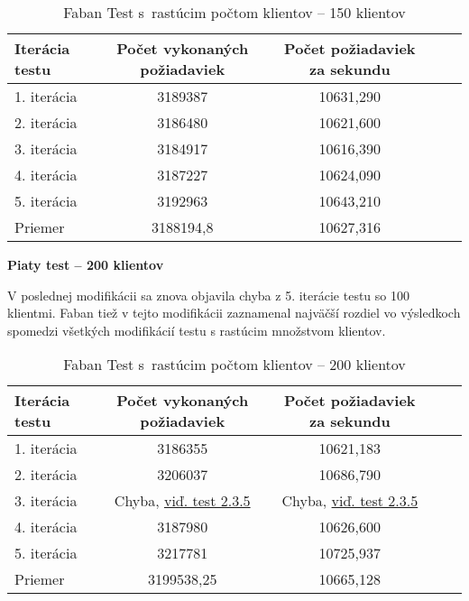 \documentclass[12pt,oneside,final]{fithesis-utf8}
\begin{document}
\begin{itemize}
\begin{table}[H]
\begin{center}
\begin{tabular}{ | l | c | c | c | c |}
		\hline
		 \textbf{Iterácia testu} & \textbf{Počet vykonaných požiadaviek} & \textbf{Počet požiadaviek za sekundu} \\ \hline
		 1. iterácia & 3189387 & 10631,290 \\ \hline
		 2. iterácia & 3186480 & 10621,600 \\ \hline
		 3. iterácia & 3184917 & 10616,390 \\ \hline
		 4. iterácia & 3187227 & 10624,090 \\ \hline
		 5. iterácia & 3192963 & 10643,210 \\ \hline
		 Priemer & 3188194,8 & 10627,316 \\ \hline
		 
\end{tabular}
\end{center}
\caption{Faban Test s~rastúcim počtom klientov -- 150 klientov}
\end{table}

\textbf{Piaty test -- 200 klientov}

V poslednej modifikácii sa znova objavila chyba z 5. iterácie testu so 100 klientmi. Faban tiež v tejto modifikácii zaznamenal najväčší rozdiel vo výsledkoch spomedzi všetkých modifikácií testu s rastúcim množstvom klientov.

\begin{table}[h!]
\begin{center}
\begin{tabular}{ | l | c | c | c | c |}
		\hline
		 \textbf{Iterácia testu} & \textbf{Počet vykonaných požiadaviek} & \textbf{Počet požiadaviek za sekundu} \\ \hline
		 1. iterácia & 3186355 & 10621,183 \\ \hline
		 2. iterácia & 3206037 & 10686,790 \\ \hline
 		 3. iterácia & Chyba, \hyperlink{label}{viď. test 2.3.5} & Chyba, \hyperlink{label}{viď. test 2.3.5}  \\ \hline
		 4. iterácia & 3187980 & 10626,600 \\ \hline
		 5. iterácia & 3217781 & 10725,937 \\ \hline
		 Priemer & 3199538,25 & 10665,128 \\ \hline
		 
\end{tabular}
\end{center}
\caption{Faban Test s~rastúcim počtom klientov -- 200 klientov}
\end{table}



\end{itemize}
\end{document}
